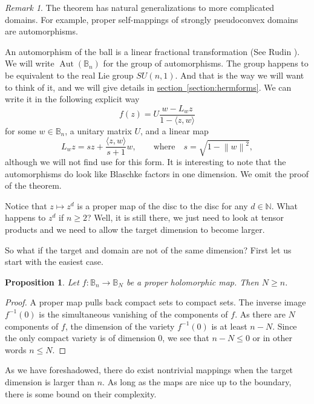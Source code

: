 \documentclass[12pt,openany]{book}
\newcommand{\Aut}{\operatorname{Aut}}
\newcommand{\norm}[1]{\left\lVert {#1} \right\rVert}
\newcommand{\N}{{\mathbb{N}}}
\newcommand{\bB}{{\mathbb{B}}}
\theoremstyle{plain}
\newtheorem{prop}[thm]{Proposition}
\theoremstyle{remark}
\newtheorem{remark}[thm]{Remark}
\theoremstyle{definition}
\theoremstyle{exercise}
\theoremstyle{example}
\newcommand{\sectionref}[1]{\hyperref[#1]{section~\ref*{#1}}}
\begin{document}
\begin{remark}
The theorem has natural generalizations to more complicated domains.
For example, proper self-mappings of strongly pseudoconvex domains are
automorphisms.
\end{remark}

An automorphism of the ball is a linear fractional transformation
(See Rudin \cite{Rudin:ball}).  We will
write  $\Aut(\bB_n)$ for the group of automorphisms.  The group happens to
be equivalent to the real Lie group $SU(n,1)$.  And that is the way
we will want to think of it, and we will give details in \sectionref{section:hermforms}.
We can write it in the following explicit way
\begin{equation}
f(z) = U \frac{w-L_w z}{1-\langle z,w \rangle}
\end{equation}
for some $w \in \bB_n$, a unitary matrix $U$, and a linear map
\begin{equation}
L_w z = s z + \frac{\langle z , w
\rangle}{s + 1} w ,
\qquad
\text{where} \quad
s = \sqrt{1-\norm{w}^2} ,
\end{equation}
although we will not find use for this form.  It is interesting to note that
the automorphisms do look like Blaschke factors in one dimension.
We omit the proof of the theorem.

Notice that $z \mapsto z^d$ is a proper map of the disc to the disc for any
$d \in \N$.  What happens to $z^d$ if $n \geq 2$?  Well, it is still there,
we just need to look at tensor products and we need to allow the target
dimension to become larger.

So what if the target and domain are not of the same dimension?  First let us
start with the easiest case.

\begin{prop}
Let $f \colon \bB_n \to \bB_N$ be a proper holomorphic map.  Then $N \geq n$.
\end{prop}

\begin{proof}
A proper map pulls back compact sets to compact sets.  The inverse image 
$f^{-1}(0)$ is the simultaneous vanishing of the components of $f$.  As
there are $N$ components of $f$, the dimension of the variety $f^{-1}(0)$
is at least $n-N$.  Since the only compact variety is of dimension 0, we see
that $n-N \leq 0$ or in other words $n \leq N$.
\end{proof}

As we have foreshadowed, there do exist nontrivial 
mappings when the target dimension is larger than $n$.  As long as the maps
are nice up to the boundary, there is some bound on their complexity.
\end{document}
